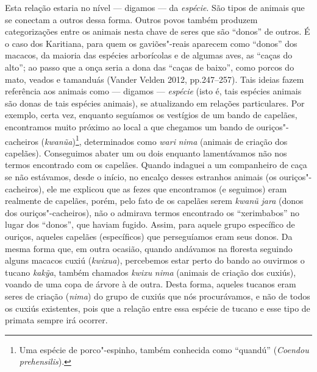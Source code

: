 Esta relação estaria no nível --- digamos --- da \emph{espécie}. São tipos
de animais que se conectam a outros dessa forma. Outros povos também
produzem categorizações entre os animais nesta chave de seres que são
``donos'' de outros. É o caso dos Karitiana, para quem os gaviões"-reais
aparecem como ``donos'' dos macacos, da maioria das espécies arborícolas
e de algumas aves, as ``caças do alto''; ao passo que a onça seria a
dona das ``caças de baixo'', como porcos do mato, veados e tamanduás
(Vander Velden 2012, pp.247--257). Tais ideias fazem referência aos
animais como --- digamos --- \emph{espécie} (isto é, tais espécies animais
são donas de tais espécies animais), se atualizando em relações
particulares. Por exemplo, certa vez, enquanto seguíamos os vestígios de
um bando de capelães, encontramos muito próximo ao local a que chegamos
um bando de ouriços"-cacheiros (\emph{kwanũa})\footnote{Uma espécie de
  porco"-espinho, também conhecida como ``quandú'' (\emph{Coendou
  prehensilis}).}, determinados como \emph{wari} \emph{nima} (animais de
criação dos capelães). Conseguimos abater um ou dois enquanto
lamentávamos não nos termos encontrado com os capelães. Quando indaguei
a um companheiro de caça se não estávamos, desde o início, no encalço
desses estranhos animais (os ouriços"-cacheiros), ele me explicou que as
fezes que encontramos (e seguimos) eram realmente de capelães, porém,
pelo fato de os capelães serem \emph{kwanũ} \emph{jara} (donos dos
ouriços"-cacheiros), não o admirava termos encontrado os ``xerimbabos'' no
lugar dos ``donos'', que haviam fugido. Assim, para aquele grupo
específico de ouriços, aqueles capelães (específicos) que perseguíamos
eram seus donos. Da mesma forma que, em outra ocasião, quando andávamos
na floresta seguindo alguns macacos cuxiú (\emph{kwixua}), percebemos
estar perto do bando ao ouvirmos o tucano \emph{kakỹa}, também chamados
\emph{kwixu} \emph{nima} (animais de criação dos cuxiús), voando de uma
copa de árvore à de outra. Desta forma, aqueles tucanos eram seres de
criação (\emph{nima}) do grupo de cuxiús que nós procurávamos, e não de
todos os cuxiús existentes, pois que a relação entre essa espécie de
tucano e esse tipo de primata sempre irá ocorrer.

